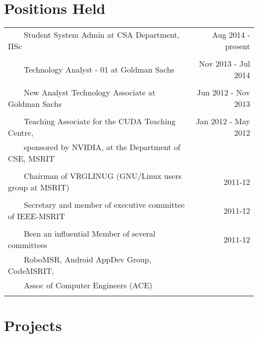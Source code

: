 \documentclass[a4paper,10pt]{article} %
\newcommand{\tabitem}{~~\llap{\textbullet}~~}
\begin{document}

\section{Positions Held}

\begin{tabular}{lr}
\tabitem Student System Admin at CSA Department, IISc & Aug 2014 - present \\
&\\
\tabitem Technology Analyst - 01 at Goldman Sachs & Nov 2013 - Jul 2014\\
&\\
\tabitem New Analyst Technology Associate at Goldman Sachs & Jun 2012 - Nov 2013\\
&\\
\tabitem Teaching Associate for the CUDA Teaching Centre,  & Jan 2012 - May 2012\\
~~~~sponsored by NVIDIA, at the Department of CSE, MSRIT &  \\
&\\
\tabitem Chairman of VRGLINUG (GNU/Linux users group at MSRIT) & 2011-12 \\
&\\
\tabitem Secretary and member of executive committee of IEEE-MSRIT & 2011-12 \\
&\\
\tabitem Been an influential Member of several committees & 2011-12 \\
~~~~RoboMSR, Android AppDev Group, CodeMSRIT, & \\
~~~~Assoc of Computer Engineers (ACE) & \\
&\\
\end{tabular}


\section{Projects}
\end{document}
